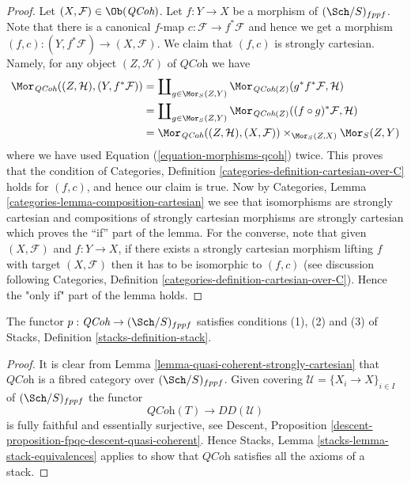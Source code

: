 \begin{proof}
Let $(X, \mathcal{F}) \in \Ob(\textit{QCoh})$.
Let $f : Y \to X$ be a morphism of $(\Sch/S)_{fppf}$.
Note that there is a canonical $f$-map $c : \mathcal{F} \to f^*\mathcal{F}$
and hence we get a morphism
$(f, c) : (Y, f^*\mathcal{F}) \to (X, \mathcal{F})$.
We claim that $(f, c)$ is strongly cartesian.
Namely, for any object $(Z, \mathcal{H})$ of $\textit{QCoh}$ we have
\begin{align*}
\Mor_{\textit{QCoh}}((Z, \mathcal{H}), (Y, f^*\mathcal{F}))
& =
\coprod\nolimits_{g \in \Mor_S(Z, Y)}
\Mor_{\textit{QCoh}(Z)}(g^*f^*\mathcal{F}, \mathcal{H}) \\
& =
\coprod\nolimits_{g \in \Mor_S(Z, Y)}
\Mor_{\textit{QCoh}(Z)}((f \circ g)^*\mathcal{F}, \mathcal{H}) \\
& =
\Mor_{\textit{QCoh}}((Z, \mathcal{H}), (X, \mathcal{F}))
\times_{\Mor_S(Z, X)} \Mor_S(Z, Y)
\end{align*}
where we have used Equation (\ref{equation-morphisms-qcoh}) twice.
This proves that the condition of
Categories, Definition \ref{categories-definition-cartesian-over-C}
holds for $(f, c)$, and hence our claim is true. Now by
Categories, Lemma \ref{categories-lemma-composition-cartesian}
we see that isomorphisms are strongly cartesian and
compositions of strongly cartesian morphisms are strongly cartesian
which proves the ``if'' part of the lemma. For the converse, note
that given $(X, \mathcal{F})$ and $f : Y \to X$, if there exists a
strongly cartesian morphism lifting $f$ with target $(X, \mathcal{F})$
then it has to be isomorphic to $(f, c)$ (see discussion following
Categories, Definition \ref{categories-definition-cartesian-over-C}).
Hence the "only if" part of the lemma holds.
\end{proof}

\begin{lemma}
\label{lemma-stack-of-quasi-coherent-sheaves}
The functor $p : \textit{QCoh} \to (\Sch/S)_{fppf}$
satisfies conditions (1), (2) and (3) of
Stacks, Definition \ref{stacks-definition-stack}.
\end{lemma}

\begin{proof}
It is clear from
Lemma \ref{lemma-quasi-coherent-strongly-cartesian}
that $\textit{QCoh}$ is a fibred category over $(\Sch/S)_{fppf}$.
Given covering $\mathcal{U} = \{X_i \to X\}_{i \in I}$ of
$(\Sch/S)_{fppf}$ the functor
$$
\textit{QCoh}(T) \longrightarrow DD(\mathcal{U})
$$
is fully faithful and essentially surjective, see
Descent, Proposition \ref{descent-proposition-fpqc-descent-quasi-coherent}.
Hence
Stacks, Lemma \ref{stacks-lemma-stack-equivalences}
applies to show that $\textit{QCoh}$ satisfies all the
axioms of a stack.
\end{proof}





